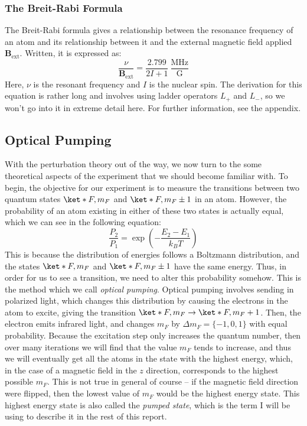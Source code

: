 \documentclass[10pt]{article}
\begin{document}
	\subsubsection{The Breit-Rabi Formula}
	The Breit-Rabi formula gives a relationship between the resonance frequency of an
	atom and its relationship between it and the external magnetic field applied \(
	\mathbf{B}_\text{ext} \). Written, it is expressed as:
	\begin{equation}
		\label{breit-rabi}
		\frac{\nu}{\mathbf{B}_\text{ext}} = \frac{2.799}{2I + 1} \
		\frac{\text{MHz}}{\text{G}}
	\end{equation}
	Here, \( \nu \) is the resonant frequency and \( I \) is the nuclear spin. The
	derivation for this equation is rather long and involves using ladder operators
	\( L_+ \) and \( L_- \), so we won't go into it in extreme detail here. For
	further information, see the appendix. 

	\subsection{Optical Pumping}
	With the perturbation theory out of the way, we now turn to the some theoretical
	aspects of the experiment that we should become familiar with. To begin, the
	objective for our experiment is to measure the transitions between two quantum
	states \( \ket*{F, m_F} \) and \( \ket*{F, m_F \pm 1} \) in an atom. However, the
	probability of an atom existing in either of these two states is actually equal,
	which we can see in the following equation:  
	\[
		\frac{P_2}{P_1} = \exp\left( - \frac{E_2 - E_1}{k_BT} \right)
	\]
	This is because the distribution of energies follows a Boltzmann distribution,
	and the states \( \ket*{F, m_F} \) and \( \ket*{F, m_F \pm 1} \) have the same
	energy. Thus, in order for us to see a transition, we need to alter this
	probability somehow. This is the method which we call \textit{optical pumping}.
	Optical pumping involves sending in polarized light, which changes this
	distribution by causing the electrons in the atom to excite, giving the
	transition \( \ket*{F, m_F} \to \ket*{F, m_F + 1} \). Then, the electron emits
	infrared light, and changes \( m_F \) by \( \Delta m_F = \{-1, 0, 1\} \)
	with equal probability. Because the excitation step only increases the quantum
	number, then over many iterations we will find that the value \( m_F \) 
	tends to increase, and thus we will eventually get all the atoms in the state 
	with the highest energy, which, in the case of a magnetic field in the \( z \)
	direction, corresponds to the highest possible \( m_F \). This is not true in
	general of course -- if the magnetic field direction were flipped, then the
	lowest value of \( m_F \) would be the highest energy state. This highest energy
	state is also called the \textit{pumped state}, which is the term I will be using
	to describe it in the rest of this report.  
\end{document}
